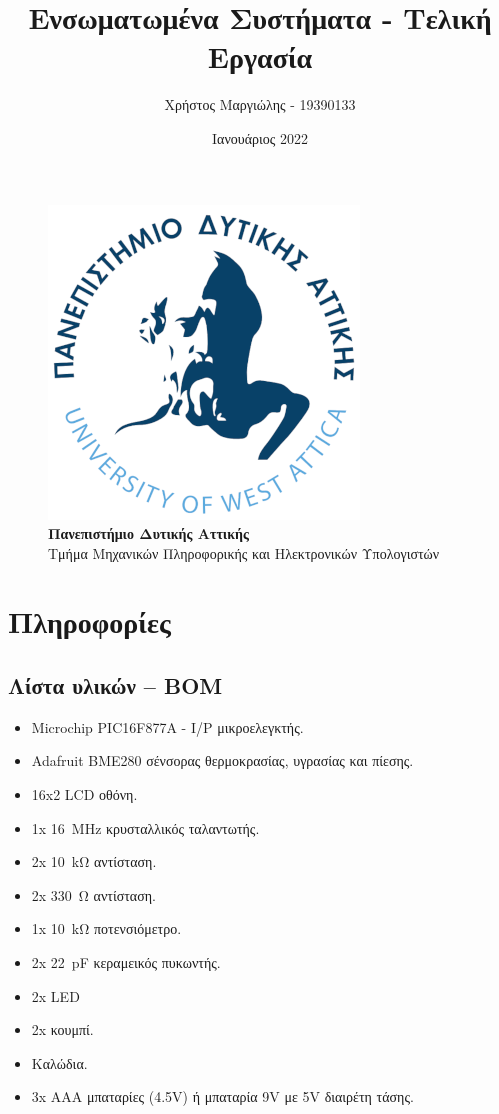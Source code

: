 \documentclass{article}
\title{Ενσωματωμένα Συστήματα - Τελική Εργασία}
\author{Χρήστος Μαργιώλης - 19390133}
\date{Ιανουάριος 2022}
\begin{document}
\begin{titlepage}
        \maketitle
        \begin{figure}[t!]
        \begin{center}
        \includegraphics[scale=0.3]{./res/uniwalogo.png} \\
        \Large
        \textbf{Πανεπιστήμιο Δυτικής Αττικής} \\
        \large
        Τμήμα Μηχανικών Πληροφορικής και Ηλεκτρονικών Υπολογιστών
        \end{center}
        \end{figure}
\end{titlepage}

\renewcommand{\contentsname}{Περιεχόμενα}
\tableofcontents
\pagebreak

\section{Πληροφορίες}
\subsection{Λίστα υλικών -- BOM}
\begin{itemize}
	\item Microchip PIC16F877A - I/P μικροελεγκτής.
	\item Adafruit BME280 σένσορας θερμοκρασίας, υγρασίας και πίεσης.
	\item 16x2 LCD οθόνη.
	\item 1x \SI{16}{\mega\hertz} κρυσταλλικός ταλαντωτής.
	\item 2x \SI{10}{\kohm} αντίσταση.
	\item 2x \SI{330}{\ohm} αντίσταση.
	\item 1x \SI{10}{\kohm} ποτενσιόμετρο.
	\item 2x \SI{22}{\pico\farad} κεραμεικός πυκωντής.
	\item 2x LED
	\item 2x κουμπί.
	\item Καλώδια.
	\item 3x AAA μπαταρίες (4.5V) ή μπαταρία 9V με 5V διαιρέτη τάσης.
\end{itemize}
\end{document}
